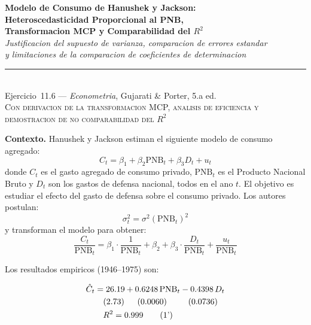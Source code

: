 \documentclass[12pt, letterpaper]{article}
\theoremstyle{remark}
\begin{document}
\begin{center}
  {\LARGE\bfseries Modelo de Consumo de Hanushek y Jackson:}\\[6pt]
  {\LARGE\bfseries Heteroscedasticidad Proporcional al PNB,}\\[6pt]
  {\LARGE\bfseries Transformacion MCP y Comparabilidad del $R^2$}\\[12pt]
  {\large\itshape Justificacion del supuesto de varianza, comparacion de errores estandar}\\
  {\large\itshape y limitaciones de la comparacion de coeficientes de determinacion}\\[14pt]
  \rule{0.55\linewidth}{0.6pt}\\[8pt]
  {\normalsize Ejercicio~11.6 --- \textit{Econometria}, Gujarati \& Porter, 5.a ed.}\\[4pt]
  {\small\textsc{Con derivacion de la transformacion MCP, analisis de eficiencia
  y demostracion de no comparabilidad del $R^2$}}
\end{center}

\vspace{10pt}

\noindent\textbf{Contexto.}\quad
Hanushek y Jackson estiman el siguiente modelo de consumo agregado:
\begin{equation}
  C_t = \beta_1 + \beta_2 \text{PNB}_t + \beta_3 D_t + u_t
  \tag{1}\label{eq:original}
\end{equation}
donde $C_t$ es el gasto agregado de consumo privado, $\text{PNB}_t$ es el
Producto Nacional Bruto y $D_t$ son los gastos de defensa nacional, todos en
el ano $t$. El objetivo es estudiar el efecto del gasto de defensa sobre el
consumo privado. Los autores postulan:
\begin{equation}
  \sigma_t^2 = \sigma^2 (\text{PNB}_t)^2
  \label{eq:heterosc}
\end{equation}
y transforman el modelo para obtener:
\begin{equation}
  \frac{C_t}{\text{PNB}_t}
    = \beta_1 \cdot \frac{1}{\text{PNB}_t}
    + \beta_2
    + \beta_3 \cdot \frac{D_t}{\text{PNB}_t}
    + \frac{u_t}{\text{PNB}_t}
  \tag{2}\label{eq:transformado}
\end{equation}

\noindent Los resultados empiricos (1946--1975) son:

\begin{align}
  \hat C_t
    &= 26.19 + 0.6248\,\text{PNB}_t - 0.4398\,D_t
  \notag\\
    &\quad (2.73) \quad\;\; (0.0060) \qquad\;\; (0.0736)
  \notag\\
    &\quad R^2 = 0.999
  \tag{1'}\label{eq:result1}
\end{align}
\end{document}
